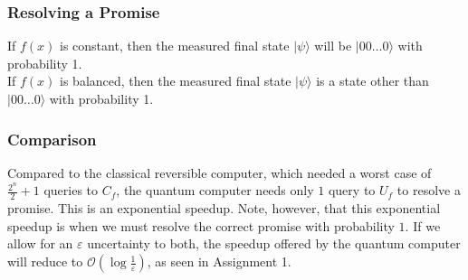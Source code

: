 \documentclass{article}
\begin{document}
    \subsubsection{Resolving a Promise}
    If $f(x)$ is constant, then the measured final state $| \psi \rangle$ will be $|00 \hdots 0\rangle$ with probability 1.\\
    If $f(x)$ is balanced, then the measured final state $| \psi \rangle$ is a state other than $|00 \hdots 0\rangle$ with probability 1.

    \subsubsection{Comparison}
    Compared to the classical reversible computer, which needed a worst case of $\frac{2^n}{2} + 1$ queries to $C_f$, the quantum computer needs only $1$ query to $U_f$ to resolve a promise. This is an exponential speedup. Note, however, that this exponential speedup is when we must resolve the correct promise with probability $1$. If we allow for an $\varepsilon$ uncertainty to both, the speedup offered by the quantum computer will reduce to $\mathcal{O}(\log{\frac{1}{\varepsilon}})$, as seen in Assignment 1. 
    
\end{document}
